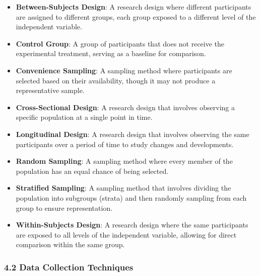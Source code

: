 \documentclass[
]{book}
\providecommand{\tightlist}{%
  \setlength{\itemsep}{0pt}\setlength{\parskip}{0pt}}
\begin{document}
\begin{itemize}
\tightlist
\item
  \textbf{Between-Subjects Design}: A research design where different participants are assigned to different groups, each group exposed to a different level of the independent variable.
\item
  \textbf{Control Group}: A group of participants that does not receive the experimental treatment, serving as a baseline for comparison.
\item
  \textbf{Convenience Sampling}: A sampling method where participants are selected based on their availability, though it may not produce a representative sample.
\item
  \textbf{Cross-Sectional Design}: A research design that involves observing a specific population at a single point in time.
\item
  \textbf{Longitudinal Design}: A research design that involves observing the same participants over a period of time to study changes and developments.
\item
  \textbf{Random Sampling}: A sampling method where every member of the population has an equal chance of being selected.
\item
  \textbf{Stratified Sampling}: A sampling method that involves dividing the population into subgroups (strata) and then randomly sampling from each group to ensure representation.
\item
  \textbf{Within-Subjects Design}: A research design where the same participants are exposed to all levels of the independent variable, allowing for direct comparison within the same group.
\end{itemize}

\subsubsection*{\texorpdfstring{\textbf{4.2 Data Collection Techniques}}{4.2 Data Collection Techniques}}\label{data-collection-techniques-1}
\end{document}

